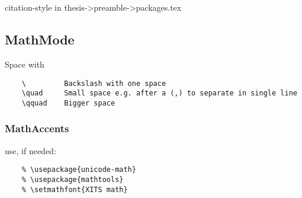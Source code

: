 \chapter*{{\color{red}{Notes (remove this)}}}
citation-style in thesis->preamble->packages.tex
\section*{MathMode}
Space with \begin{verbatim}
    \         Backslash with one space
    \quad     Small space e.g. after a (,) to separate in single line
    \qquad    Bigger space
\end{verbatim}

\subsection*{MathAccents}
use, if needed:\begin{verbatim}
    % \usepackage{unicode-math}
    % \usepackage{mathtools}
    % \setmathfont{XITS math}    
\end{verbatim}

